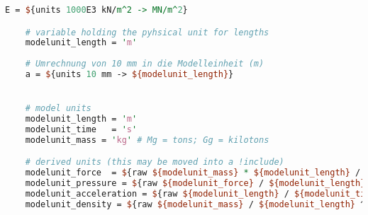 \begin{lstlisting}[language=perl, caption={Physical units in inut files},label={patterns-physical-units}]
    E = ${units 1000E3 kN/m^2 -> MN/m^2}

    # variable holding the pyhsical unit for lengths
    modelunit_length = 'm'
    
    # Umrechnung von 10 mm in die Modelleinheit (m)
    a = ${units 10 mm -> ${modelunit_length}}


    # model units
    modelunit_length = 'm'
    modelunit_time   = 's'
    modelunit_mass = 'kg' # Mg = tons; Gg = kilotons

    # derived units (this may be moved into a !include)
    modelunit_force  = ${raw ${modelunit_mass} * ${modelunit_length} / ${modelunit_time} ^ 2}
    modelunit_pressure = ${raw ${modelunit_force} / ${modelunit_length} ^ 2}
    modelunit_acceleration = ${raw ${modelunit_length} / ${modelunit_time} ^ 2}
    modelunit_density = ${raw ${modelunit_mass} / ${modelunit_length} ^ 3}

\end{lstlisting}